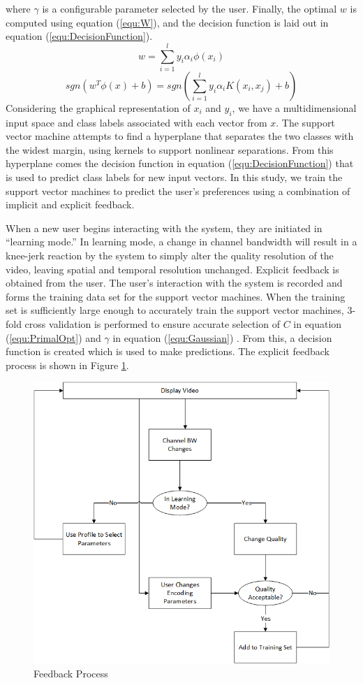 where $\gamma$ is a configurable parameter selected by the user. Finally, the optimal $w$ is computed using equation (\ref{equ:W}), and the decision function is laid out in equation (\ref{equ:DecisionFunction}).
\begin{equation}
\label{equ:W}
w = \sum_{i=1}^{l} y_i \alpha_i \phi (x_i)
\end{equation}
\begin{equation}
\label{equ:DecisionFunction}
sgn(w^T\phi (x) + b) = sgn(\sum_{i=1}^{l} y_i\alpha_i K(x_i, x_j) +b)
\end{equation}
Considering the graphical representation of $x_i$ and $y_i$, we have a multidimensional input space and class labels associated with each vector from $x$. The support vector machine attempts to find a hyperplane that separates the two classes with the widest margin, using kernels to support nonlinear separations. From this hyperplane comes the decision function in equation (\ref{equ:DecisionFunction}) that is used to predict class labels for new input vectors. In this study, we train the support vector machines to predict the user’s preferences using a combination of implicit and explicit feedback. 

When a new user begins interacting with the system, they are initiated in ``learning mode.'' In learning mode, a change in channel bandwidth will result in a knee-jerk reaction by the system to simply alter the quality resolution of the video, leaving spatial and temporal resolution unchanged. Explicit feedback is obtained from the user. The user's interaction with the system is recorded and forms the training data set for the support vector machines. When the training set is sufficiently large enough to accurately train the support vector machines, 3-fold cross validation is performed to ensure accurate selection of $C$ in equation (\ref{equ:PrimalOpt}) and $\gamma$ in equation (\ref{equ:Gaussian}) \cite{LibSVM}. From this, a decision function is created which is used to make predictions. The explicit feedback process is shown in Figure \ref{fig:Feedback}.
\begin{figure}[H]
\centering
\includegraphics[width=0.5\linewidth]{images/BandwidthChangeDecisionTree.png}
\caption{Feedback Process}
\label{fig:Feedback}
\end{figure}

